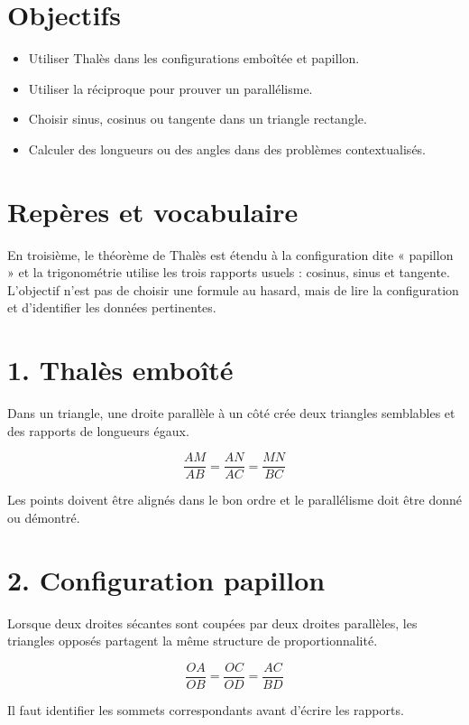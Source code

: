 
\section{Objectifs}
\begin{itemize}
\item Utiliser Thalès dans les configurations emboîtée et papillon.
\item Utiliser la réciproque pour prouver un parallélisme.
\item Choisir sinus, cosinus ou tangente dans un triangle rectangle.
\item Calculer des longueurs ou des angles dans des problèmes contextualisés.
\end{itemize}

\section{Repères et vocabulaire}
En troisième, le théorème de Thalès est étendu à la configuration dite « papillon » et la trigonométrie utilise les trois rapports usuels : cosinus, sinus et tangente. L’objectif n’est pas de choisir une formule au hasard, mais de lire la configuration et d’identifier les données pertinentes.

\section{1. Thalès emboîté}
Dans un triangle, une droite parallèle à un côté crée deux triangles semblables et des rapports de longueurs égaux.

\[
\dfrac{AM}{AB}=\dfrac{AN}{AC}=\dfrac{MN}{BC}
\]

\begin{exemple}
Les points doivent être alignés dans le bon ordre et le parallélisme doit être donné ou démontré.
\end{exemple}

\section{2. Configuration papillon}
Lorsque deux droites sécantes sont coupées par deux droites parallèles, les triangles opposés partagent la même structure de proportionnalité.

\[
\dfrac{OA}{OB}=\dfrac{OC}{OD}=\dfrac{AC}{BD}
\]

\begin{exemple}
Il faut identifier les sommets correspondants avant d’écrire les rapports.
\end{exemple}

